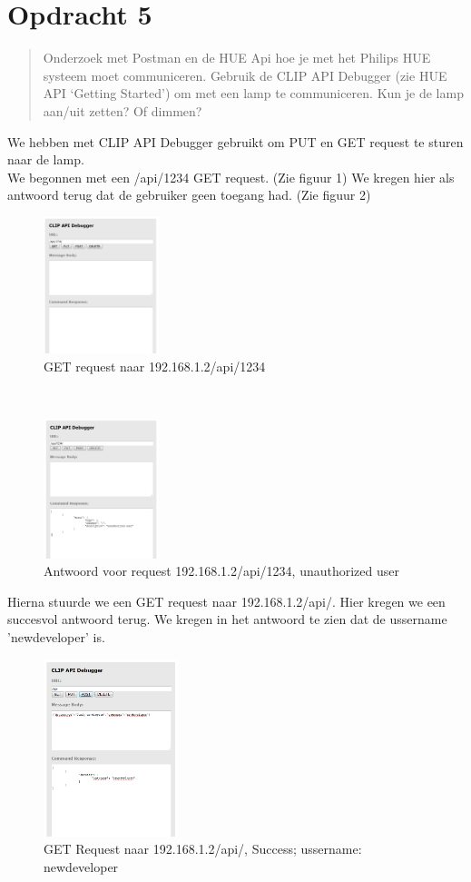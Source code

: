 \documentclass[12pt]{article}
\begin{document}
\section*{Opdracht 5}
\begin{quote}
Onderzoek met Postman en de HUE Api hoe je met het Philips HUE systeem moet communiceren. Gebruik de CLIP API Debugger (zie HUE API ‘Getting Started’) om met een lamp te communiceren. Kun je de lamp aan/uit zetten? Of dimmen?
\end{quote}
We hebben met CLIP API Debugger gebruikt om PUT en GET request te sturen naar de lamp.\\
We begonnen met een /api/1234 GET request. (Zie figuur 1) We kregen hier als antwoord terug dat de gebruiker geen toegang had. (Zie figuur 2)
\begin{figure}[h!]
  \centering
      \includegraphics[width=0.3\textwidth]{stap1}
  \caption{GET request naar 192.168.1.2/api/1234}
\end{figure}
\\
\begin{figure}[h!]
  \centering
      \includegraphics[width=0.3\textwidth]{stap2}
  \caption{Antwoord voor request 192.168.1.2/api/1234, unauthorized user}
\end{figure}
\newpage
Hierna stuurde we een GET request naar 192.168.1.2/api/. Hier kregen we een succesvol antwoord terug. We kregen in het antwoord te zien dat de ussername 'newdeveloper' is.
\begin{figure}[h!]
  \centering
      \includegraphics[width=0.35\textwidth]{stap3}
  \caption{GET Request naar 192.168.1.2/api/, Success; ussername: newdeveloper }
\end{figure}
\end{document}
